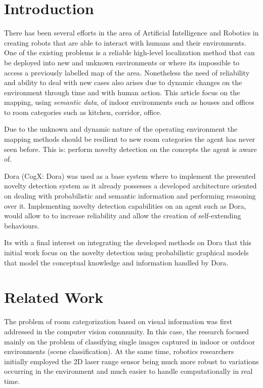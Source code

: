 \documentclass[runningheads,a4paper]{llncs}
\begin{document}
\section{Introduction}
There has been several efforts in the area of Artificial Intelligence and Robotics
in creating robots that are able to interact with humans and their environments.
One of the existing problems is a reliable high-level localization method that can
be deployed into new and unknown environments or where its impossible to access a
previously labelled map of the area. Nonetheless the need of reliability and ability
to deal with new cases also arises due to dynamic changes on the environment through
time and with human action.
This article focus on the mapping, using \emph{semantic data}, of indoor
environments such as houses and offices to room categories such as kitchen,
corridor, office.

Due to the unknown and dynamic nature of the operating environment the
mapping methods should be resilient to new room categories the agent has never seen
before. This is: perform novelty detection on the concepts the agent is aware of.

Dora (CogX: Dora) was used as a base system where to implement the
presented novelty detection system as it already possesses a developed architecture
oriented on dealing with probabilistic and semantic information and performing
reasoning over it.
Implementing novelty detection capabilities on an agent such as Dora, would allow to
to increase reliability and allow the creation of self-extending behaviours.

Its with a final interest on integrating the developed methods on Dora that this
initial work focus on the novelty detection using probabilistic graphical models
that model the conceptual knowledge and information handled by Dora.


\section{Related Work}
The problem of room categorization based on visual information was first addressed
in the computer vision community. In this case, the research focused mainly on the
problem of classifying single images captured in indoor or outdoor environments
(scene classification)\cite{oliva2006building,torralba2003contextual}.
At the same time, robotics researchers initially employed
the 2D laser range sensor being much more robust to variations occurring in the
environment and much easier to handle computationally in real time\cite{mozos2005supervised}.
\end{document}
